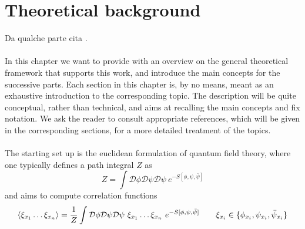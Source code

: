 \chapter{Theoretical background}
\label{chap:background}

Da qualche parte cita \cite{carosso2020novel}. \\~\\
In this chapter we want to provide with an overview on the general theoretical framework that supports this work, and introduce the main concepts for the successive parts. Each section in this chapter is, by no means, meant as an exhaustive introduction to the corresponding topic. The description will be quite conceptual, rather than technical, and aims at recalling the main concepts and fix notation. We ask the reader to consult appropriate references,  which will be given in the corresponding sections, for a more detailed treatment of the topics. \\~\\
The starting set up is the euclidean formulation of quantum field theory, where one typically defines a path integral $Z$ as 
\begin{equation}
    Z = \int \mathcal{D}\phi\mathcal{D}\psi\mathcal{D}\psi \ e^{-S[\phi, \psi, \bar\psi]}
    \label{eq:path_integral_generic}
\end{equation}
and aims to compute correlation functions
\begin{equation*}
        \left\langle \xi_{x_1} \dots \xi_{x_n}  \right\rangle = \frac{1}{Z} \int \mathcal{D}\phi\mathcal{D}\psi\mathcal{D}\psi \ \xi_{x_1} \dots \xi_{x_n} \ e^{-S[\phi, \psi, \bar\psi]} \qquad \xi_{x_i} \in \{\phi_{x_i}, \psi_{x_i}, \bar\psi_{x_i}\} \\
\end{equation*}
